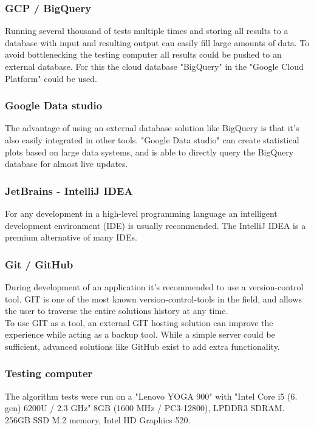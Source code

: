 \documentclass[a4paper]{article}
\begin{document}
\subsubsection{GCP / BigQuery}
Running several thousand of tests multiple times and storing all results to a database with
input and resulting output can easily fill large amounts of data. To avoid bottlenecking the
testing computer all results could be pushed to an external database. For this the cloud database
"BigQuery" in the "Google Cloud Platform" could be used.

\subsubsection{Google Data studio}
The advantage of using an external database solution like BigQuery is that it's also easily
integrated in other tools. "Google Data studio" can create statistical plots based on large
data systems, and is able to directly query the BigQuery database for almost live updates.

\subsubsection{JetBrains - IntelliJ IDEA}
For any development in a high-level programming language an intelligent development environment 
(IDE) is usually recommended. The IntelliJ IDEA is a premium alternative of many IDEs.

\subsubsection{Git / GitHub}
During development of an application it's recommended to use a version-control tool. GIT is
one of the most known version-control-tools in the field, and allows the user to traverse
the entire solutions history at any time.
\\
To use GIT as a tool, an external GIT hosting solution can improve the experience while acting
as a backup tool. While a simple server could be sufficient, advanced solutions like GitHub 
exist to add extra functionality.

\subsubsection{Testing computer}
The algorithm tests were run on a "Lenovo YOGA 900" with "Intel Core i5 (6. gen) 6200U / 2.3 GHz" 
8GB (1600 MHz / PC3-12800), LPDDR3 SDRAM. 256GB SSD M.2 memory, Intel HD Graphics 520.
\end{document}
